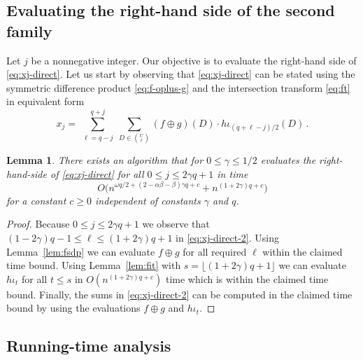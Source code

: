 \documentclass{amsart}
\newtheorem{Lem}{Lemma}
\begin{document}
\subsection{Evaluating the right-hand side of the second family}

Let $j$ be a nonnegative integer. Our objective is to evaluate 
the right-hand side of \eqref{eq:xj-direct}. Let us start
by observing that \eqref{eq:xj-direct} can be stated using
the symmetric difference product \eqref{eq:f-oplus-g} 
and the intersection transform \eqref{eq:ft} in equivalent
form
\begin{equation}
\label{eq:xj-direct-2}
x_j=
\sum_{\substack{\ell=q-j}}^{q+j}
\sum_{D\in\binom{U}{\ell}}
(f\oplus g)(D)\cdot h\iota_{(q+\ell-j)/2}(D)\,.
\end{equation}

\begin{Lem}
\label{lem:xj-direct}
There exists an algorithm that for $0\leq\gamma\leq 1/2$
evaluates the right-hand-side of \eqref{eq:xj-direct}
for all $0\leq j\leq 2\gamma q+1$ in time 
\[
O\bigl(n^{\omega q/2+(2-\alpha\beta-\beta)\gamma q+c}+n^{(1+2\gamma)q+c}\bigr)
\] 
for a constant $c\geq 0$ independent of constants $\gamma$ and $q$. 
\end{Lem}
\begin{proof}
Because $0\leq j\leq 2\gamma q+1$ we observe that
$(1-2\gamma)q-1\leq\ell\leq(1+2\gamma)q+1$ in \eqref{eq:xj-direct-2}. 
Using Lemma~\ref{lem:fsdp} we can evaluate $f\oplus g$ for
all required $\ell$ within the claimed time bound. 
Using Lemma~\ref{lem:fit} with 
$s=\lfloor(1+2\gamma)q+1\rfloor$ we can evaluate $h\iota_t$ for all 
$t\leq s$ in $O(n^{(1+2\gamma)q+c})$ time which is within the claimed time bound. Finally,
the sums in \eqref{eq:xj-direct-2} can be computed
in the claimed time bound by using the evaluations $f\oplus g$
and $h\iota_t$.
\end{proof}


\subsection{Running-time analysis}
\label{sect:runtime}
\end{document}
